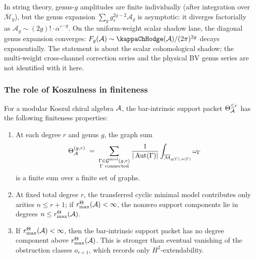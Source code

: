 \begin{remark}
In string theory, genus-$g$ amplitudes are finite individually (after integration over $\overline{\mathcal{M}}_g$), but the genus expansion $\sum_g g_s^{2g-2} \mathcal{A}_g$ is asymptotic: it diverges factorially as $\mathcal{A}_g \sim (2g)! \cdot \alpha'^{-g}$. On the uniform-weight scalar shadow lane, the diagonal genus expansion converges: $F_g(\cA) \sim \kappaChHodge(\cA)/(2\pi)^{2g}$ decays exponentially. The statement is about the scalar cohomological shadow; the multi-weight cross-channel correction series and the physical BV genus series are not identified with it here.
\end{remark}

\subsubsection{The role of Koszulness in finiteness}

\begin{proposition}
For a modular Koszul chiral algebra $\mathcal{A}$, the bar-intrinsic support
packet \(\Theta_{\mathcal{A}}^{\leq r}\) has the following finiteness properties:
\begin{enumerate}[label=\textup{(\roman*)}]
\item At each degree $r$ and genus $g$, the graph sum
 \begin{equation}%
 \Theta_\cA^{(g,r)} \;=\; \sum_{\substack{\Gamma \in \Gmod(g,r) \\ \Gamma \text{ connected}}} \frac{1}{|\Aut(\Gamma)|} \int_{\overline{\mathcal{M}}_{g(\Gamma),n(\Gamma)}} \omega_\Gamma
 \end{equation}
 is a finite sum over a finite set of graphs.
\item At fixed total degree $r$, the transferred cyclic minimal model contributes only arities $n\leq r+1$; if \(r^\Theta_{\max}(\mathcal{A})<\infty\), the nonzero support components lie in degrees \(n\leq r^\Theta_{\max}(\mathcal{A})\).
\item If \(r^\Theta_{\max}(\mathcal{A})<\infty\), then the bar-intrinsic support packet has no degree component above \(r^\Theta_{\max}(\mathcal{A})\).  This is stronger than eventual vanishing of the obstruction classes \(o_{r+1}\), which records only \(H^2\)-extendability.
\end{enumerate}
\end{proposition}


